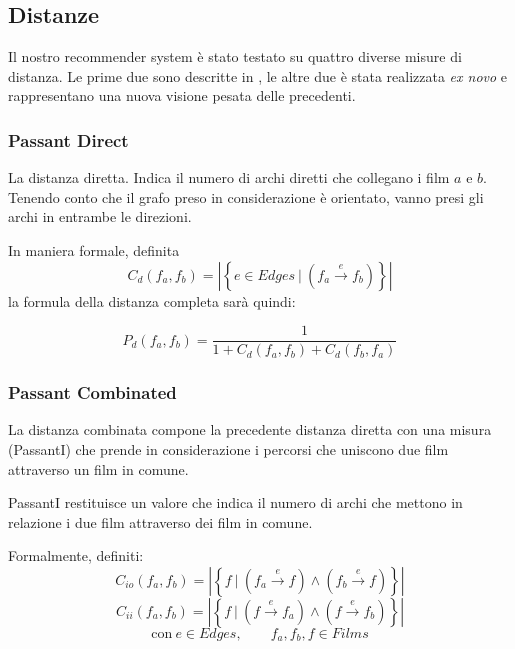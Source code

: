 \subsection{Distanze}

Il nostro recommender system è stato testato su quattro diverse misure di distanza.
Le prime due sono descritte in \citet{passant2010measuring}, le altre due è stata realizzata \emph{ex novo} e rappresentano una nuova visione pesata delle precedenti.


\subsubsection{Passant Direct}
\label{PassantD}
La distanza diretta. Indica il numero di archi diretti che collegano i film $a$ e $b$. Tenendo conto che il grafo preso in considerazione è orientato, vanno presi gli archi in entrambe le direzioni.

In maniera formale, definita $$C_{d}(f_a,f_b) = \left\vert \left\{ e \in Edges \  | \  (f_a \xrightarrow{~e~} f_b ) \right\} \right\vert$$ la formula della distanza completa sarà quindi:


    \begin{equation}
        P_{d}(f_{a},f_{b}) = \frac{1} {1+C_{d}(f_{a},f_{b})+C_{d}(f_{b},f_{a})}
    \end{equation}

\subsubsection{Passant Combinated}
\label{PassantC}

La distanza combinata compone la precedente distanza diretta con una misura
(PassantI) che prende in considerazione i percorsi che uniscono due film
attraverso un film in comune.

PassantI restituisce un valore che indica il numero di archi che
mettono in relazione i due film attraverso dei film in comune.

Formalmente, definiti:
$$C_{io}(f_a,f_b) = \left\vert \left\{ f \  | \  (f_a \xrightarrow{~e~} f ) \wedge (f_b \xrightarrow{~e~} f) \right\} \right\vert$$
$$C_{ii}(f_a,f_b) = \left\vert \left\{ f \  | \  ( f \xrightarrow{~e~} f_a ) \wedge ( f \xrightarrow{~e~} f_b) \right\} \right\vert$$
$$\text{con} \ e \in Edges  , \qquad f_a,f_b,f \in Films $$

